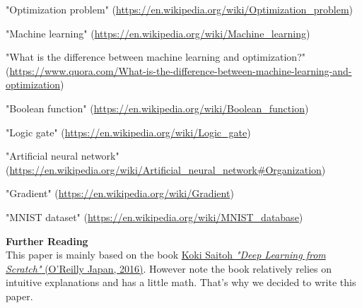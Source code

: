 \documentclass{article}
\theoremstyle{definition}
\begin{document}
\begin{thebibliography}{100}

"Optimization problem" (\url{https://en.wikipedia.org/wiki/Optimization_problem})

"Machine learning" (\url{https://en.wikipedia.org/wiki/Machine_learning})

"What is the difference between machine learning and optimization?" (\url{https://www.quora.com/What-is-the-difference-between-machine-learning-and-optimization})

"Boolean function" (\url{https://en.wikipedia.org/wiki/Boolean_function})

"Logic gate" (\url{https://en.wikipedia.org/wiki/Logic_gate})

"Artificial neural network" (\url{https://en.wikipedia.org/wiki/Artificial_neural_network#Organization})

"Gradient" (\url{https://en.wikipedia.org/wiki/Gradient})

"MNIST dataset" (\url{https://en.wikipedia.org/wiki/MNIST_database})

\end{thebibliography}

\enter
{\bf Further Reading}\\
This paper is mainly based on the book \href{https://www.oreilly.co.jp/books/9784873117584/}{Koki Saitoh {\it "Deep Learning from Scratch"} (O'Reilly Japan, 2016)}. However note the book relatively relies on intuitive explanations and has a little math. That's why we decided to write this paper.
\end{document}
